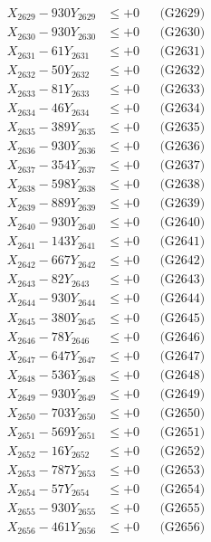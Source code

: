 \documentclass[a4paper,10pt]{article}
\begin{document}
{\begin{align}
X_{2629} - 930Y_{2629} &\leq +0 && \text{(G2629)} \\
X_{2630} - 930Y_{2630} &\leq +0 && \text{(G2630)} \\
\allowbreak
X_{2631} - 61Y_{2631} &\leq +0 && \text{(G2631)} \\
X_{2632} - 50Y_{2632} &\leq +0 && \text{(G2632)} \\
X_{2633} - 81Y_{2633} &\leq +0 && \text{(G2633)} \\
X_{2634} - 46Y_{2634} &\leq +0 && \text{(G2634)} \\
X_{2635} - 389Y_{2635} &\leq +0 && \text{(G2635)} \\
X_{2636} - 930Y_{2636} &\leq +0 && \text{(G2636)} \\
X_{2637} - 354Y_{2637} &\leq +0 && \text{(G2637)} \\
X_{2638} - 598Y_{2638} &\leq +0 && \text{(G2638)} \\
X_{2639} - 889Y_{2639} &\leq +0 && \text{(G2639)} \\
X_{2640} - 930Y_{2640} &\leq +0 && \text{(G2640)} \\
\allowbreak
X_{2641} - 143Y_{2641} &\leq +0 && \text{(G2641)} \\
X_{2642} - 667Y_{2642} &\leq +0 && \text{(G2642)} \\
X_{2643} - 82Y_{2643} &\leq +0 && \text{(G2643)} \\
X_{2644} - 930Y_{2644} &\leq +0 && \text{(G2644)} \\
X_{2645} - 380Y_{2645} &\leq +0 && \text{(G2645)} \\
X_{2646} - 78Y_{2646} &\leq +0 && \text{(G2646)} \\
X_{2647} - 647Y_{2647} &\leq +0 && \text{(G2647)} \\
X_{2648} - 536Y_{2648} &\leq +0 && \text{(G2648)} \\
X_{2649} - 930Y_{2649} &\leq +0 && \text{(G2649)} \\
X_{2650} - 703Y_{2650} &\leq +0 && \text{(G2650)} \\
\allowbreak
X_{2651} - 569Y_{2651} &\leq +0 && \text{(G2651)} \\
X_{2652} - 16Y_{2652} &\leq +0 && \text{(G2652)} \\
X_{2653} - 787Y_{2653} &\leq +0 && \text{(G2653)} \\
X_{2654} - 57Y_{2654} &\leq +0 && \text{(G2654)} \\
X_{2655} - 930Y_{2655} &\leq +0 && \text{(G2655)} \\
X_{2656} - 461Y_{2656} &\leq +0 && \text{(G2656)} \\

\end{align}}
\end{document}
